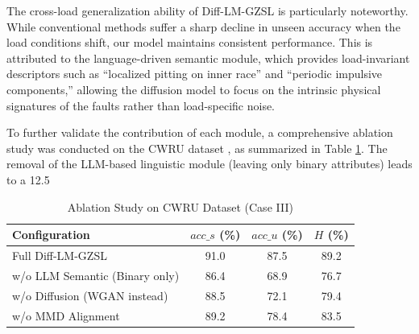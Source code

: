 \documentclass[journal]{IEEEtran}
\begin{document}
The cross-load generalization ability of Diff-LM-GZSL is particularly noteworthy. While conventional methods suffer a sharp decline in unseen accuracy when the load conditions shift, our model maintains consistent performance. This is attributed to the language-driven semantic module, which provides load-invariant descriptors such as ``localized pitting on inner race'' and ``periodic impulsive components,'' allowing the diffusion model to focus on the intrinsic physical signatures of the faults rather than load-specific noise.

To further validate the contribution of each module, a comprehensive ablation study was conducted on the CWRU dataset \cite{Downs1993TEP}, as summarized in Table \ref{tab:cwru_ablation}. The removal of the LLM-based linguistic module (leaving only binary attributes) leads to a 12.5%

\begin{table}[ht]
\centering
\caption{Ablation Study on CWRU Dataset (Case III)}
\label{tab:cwru_ablation}
\begin{tabular}{lccc}
\toprule
Configuration & $acc\_s$ (\%) & $acc\_u$ (\%) & $H$ (\%) \\ \midrule
Full Diff-LM-GZSL & 91.0 & 87.5 & 89.2 \\
w/o LLM Semantic (Binary only) & 86.4 & 68.9 & 76.7 \\
w/o Diffusion (WGAN instead) & 88.5 & 72.1 & 79.4 \\
w/o MMD Alignment & 89.2 & 78.4 & 83.5 \\
\bottomrule
\end{tabular}
\end{table}
\end{document}

